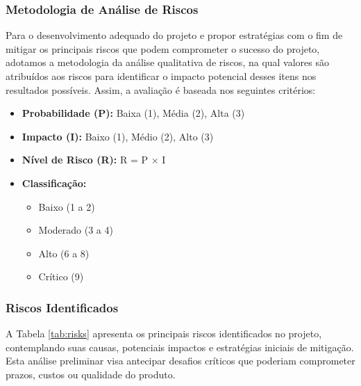 \documentclass[a4paper, 12pt]{article}
\begin{document}
\subsubsection{Metodologia de Análise de Riscos}

Para o desenvolvimento adequado do projeto e propor estratégias com o fim de mitigar os principais riscos que podem comprometer o sucesso do projeto, adotamos a metodologia da análise qualitativa de riscos, na qual valores são atribuídos aos riscos para identificar o impacto potencial desses itens nos resultados possíveis. Assim, a avaliação é baseada nos seguintes critérios:

\begin{itemize}
    \item \textbf{Probabilidade (P):} Baixa (1), Média (2), Alta (3)
    \item \textbf{Impacto (I):} Baixo (1), Médio (2), Alto (3)
    \item \textbf{Nível de Risco (R):} R = P × I
    \item \textbf{Classificação:}
    \begin{itemize}
        \item Baixo (1 a 2)
        \item Moderado (3 a 4)
        \item Alto (6 a 8)
        \item Crítico (9)
    \end{itemize}
\end{itemize}

\subsubsection{Riscos Identificados}
A Tabela \ref{tab:risks} apresenta os principais riscos identificados no projeto, contemplando suas causas, potenciais impactos e estratégias iniciais de mitigação. Esta análise preliminar visa antecipar desafios críticos que poderiam comprometer prazos, custos ou qualidade do produto. 
\end{document}

